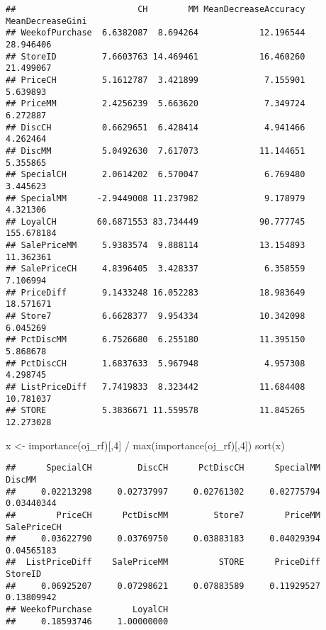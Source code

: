 \documentclass[
]{article}
\newenvironment{Shaded}{\begin{snugshade}}{\end{snugshade}}
\newcommand{\DecValTok}[1]{\textcolor[rgb]{0.00,0.00,0.81}{#1}}
\newcommand{\FunctionTok}[1]{\textcolor[rgb]{0.00,0.00,0.00}{#1}}
\newcommand{\NormalTok}[1]{#1}
\newcommand{\OtherTok}[1]{\textcolor[rgb]{0.56,0.35,0.01}{#1}}
\newcommand{\SpecialCharTok}[1]{\textcolor[rgb]{0.00,0.00,0.00}{#1}}
\begin{document}
\begin{verbatim}
##                        CH        MM MeanDecreaseAccuracy MeanDecreaseGini
## WeekofPurchase  6.6382087  8.694264            12.196544        28.946406
## StoreID         7.6603763 14.469461            16.460260        21.499067
## PriceCH         5.1612787  3.421899             7.155901         5.639893
## PriceMM         2.4256239  5.663620             7.349724         6.272887
## DiscCH          0.6629651  6.428414             4.941466         4.262464
## DiscMM          5.0492630  7.617073            11.144651         5.355865
## SpecialCH       2.0614202  6.570047             6.769480         3.445623
## SpecialMM      -2.9449008 11.237982             9.178979         4.321306
## LoyalCH        60.6871553 83.734449            90.777745       155.678184
## SalePriceMM     5.9383574  9.888114            13.154893        11.362361
## SalePriceCH     4.8396405  3.428337             6.358559         7.106994
## PriceDiff       9.1433248 16.052283            18.983649        18.571671
## Store7          6.6628377  9.954334            10.342098         6.045269
## PctDiscMM       6.7526680  6.255180            11.395150         5.868678
## PctDiscCH       1.6837633  5.967948             4.957308         4.298745
## ListPriceDiff   7.7419833  8.323442            11.684408        10.781037
## STORE           5.3836671 11.559578            11.845265        12.273028
\end{verbatim}

\begin{Shaded}
\begin{Highlighting}[]
\NormalTok{x }\OtherTok{\textless{}{-}} \FunctionTok{importance}\NormalTok{(oj\_rf)[,}\DecValTok{4}\NormalTok{] }\SpecialCharTok{/} \FunctionTok{max}\NormalTok{(}\FunctionTok{importance}\NormalTok{(oj\_rf)[,}\DecValTok{4}\NormalTok{])}
\FunctionTok{sort}\NormalTok{(x)}
\end{Highlighting}
\end{Shaded}

\begin{verbatim}
##      SpecialCH         DiscCH      PctDiscCH      SpecialMM         DiscMM 
##     0.02213298     0.02737997     0.02761302     0.02775794     0.03440344 
##        PriceCH      PctDiscMM         Store7        PriceMM    SalePriceCH 
##     0.03622790     0.03769750     0.03883183     0.04029394     0.04565183 
##  ListPriceDiff    SalePriceMM          STORE      PriceDiff        StoreID 
##     0.06925207     0.07298621     0.07883589     0.11929527     0.13809942 
## WeekofPurchase        LoyalCH 
##     0.18593746     1.00000000
\end{verbatim}
\end{document}
